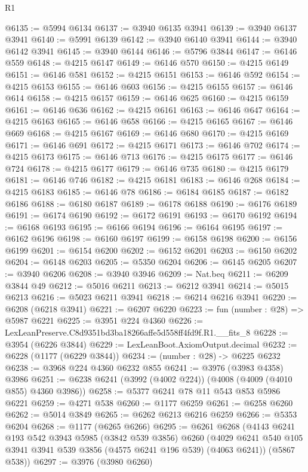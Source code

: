 \begin{lexlean}{R1}
\begin{coremodule}
@6135 := @5994 @6134
@6137 := @3940 @6135 @3941
@6139 := @3940 @6137 @3941
@6140 := @5991 @6139
@6142 := @3940 @6140 @3941
@6144 := @3940 @6142 @3941
@6145 := @3940 @6144
@6146 := @5796 @3844
@6147 := @6146 @559
@6148 := @4215 @6147
@6149 := @6146 @570
@6150 := @4215 @6149
@6151 := @6146 @581
@6152 := @4215 @6151
@6153 := @6146 @592
@6154 := @4215 @6153
@6155 := @6146 @603
@6156 := @4215 @6155
@6157 := @6146 @614
@6158 := @4215 @6157
@6159 := @6146 @625
@6160 := @4215 @6159
@6161 := @6146 @636
@6162 := @4215 @6161
@6163 := @6146 @647
@6164 := @4215 @6163
@6165 := @6146 @658
@6166 := @4215 @6165
@6167 := @6146 @669
@6168 := @4215 @6167
@6169 := @6146 @680
@6170 := @4215 @6169
@6171 := @6146 @691
@6172 := @4215 @6171
@6173 := @6146 @702
@6174 := @4215 @6173
@6175 := @6146 @713
@6176 := @4215 @6175
@6177 := @6146 @724
@6178 := @4215 @6177
@6179 := @6146 @735
@6180 := @4215 @6179
@6181 := @6146 @746
@6182 := @4215 @6181
@6183 := @6146 @268
@6184 := @4215 @6183
@6185 := @6146 @78
@6186 := @6184 @6185
@6187 := @6182 @6186
@6188 := @6180 @6187
@6189 := @6178 @6188
@6190 := @6176 @6189
@6191 := @6174 @6190
@6192 := @6172 @6191
@6193 := @6170 @6192
@6194 := @6168 @6193
@6195 := @6166 @6194
@6196 := @6164 @6195
@6197 := @6162 @6196
@6198 := @6160 @6197
@6199 := @6158 @6198
@6200 := @6156 @6199
@6201 := @6154 @6200
@6202 := @6152 @6201
@6203 := @6150 @6202
@6204 := @6148 @6203
@6205 := @5350 @6204
@6206 := @6145 @6205
@6207 := @3940 @6206
@6208 := @3940 @3946
@6209 := Nat.beq
@6211 := @6209 @3844 @49
@6212 := @5016 @6211
@6213 := @6212 @3941
@6214 := @5015 @6213
@6216 := @5023 @6211 @3941
@6218 := @6214 @6216 @3941
@6220 := @6208 (@6218 @3941)
@6221 := @6207 @6220
@6223 := fun (number : @28) => @5987 @6221
@6225 := @3951 @224 @4360
@6226 := LexLeanPreserve.C8d9351bd3ba18266affe5d558ff4fd9f.R1.__fits_8
@6228 := @3954 (@6226 @3844)
@6229 := LexLeanBoot.AxiomOutput.decimal
@6232 := @6228 (@1177 (@6229 @3844))
@6234 := (number : @28) -> @6225 @6232
@6238 := @3968 @224 @4360 @6232 @855
@6241 := @3976 (@3983 @4358) @3986
@6251 := @6238 @6241 (@3992 (@4002 @224)) (@4008 (@4009 (@4010 @855) @4360 @3986))
@6258 := @5377 @6241 @78 @11 @543 @853 @5986 @6221
@6259 := @4271 @538
@6260 := @1177 @6259
@6261 := @6258 @6260
@6262 := @5014 @3849
@6265 := @6262 @6213 @6216 @6259
@6266 := @5353 @6204
@6268 := @1177 (@6265 @6266)
@6295 := @6261
    @6268
    (@4143
      @6241
      @193
      @542
      @3943
      @5985
      (@3842 @539 @3856)
      @6260
      (@4029 @6241 @540 @105 @3941 @3941 @539 @3856 (@4575 @6241 @196 @539) (@4063 @6241))
      (@5867 @538))
@6297 := @3976 (@3980 @6260)

\end{coremodule}
\end{lexlean}
